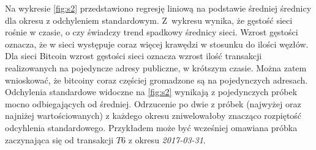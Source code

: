 \documentclass[12pt, twoside, final, openany]{mgr}
\begin{document}
\indent Na wykresie \ref{fig:s2} przedstawiono regresję liniową na podstawie średniej średnicy dla okresu z odchyleniem standardowym. Z~wykresu wynika, że gęstość sieci rośnie w czasie, o czy świadczy trend spadkowy średnicy sieci. Wzrost gęstości oznacza, że w sieci występuje coraz więcej krawędzi w stosunku do ilości węzłów. Dla sieci Bitcoin wzrost gęstości sieci oznacza wzrost ilość transakcji realizowanych na pojedyncze adresy publiczne, w krótszym czasie. Można zatem wnioskować, że bitcoiny coraz częściej gromadzone są na pojedynczych adresach. Odchylenia standardowe widoczne na \ref{fig:s2} wynikają z pojedynczych próbek mocno odbiegających od średniej. Odrzucenie po dwie z próbek (najwyżej oraz najniżej wartościowanych) z każdego okresu zniwelowałoby znacząco rozpiętość odcyhlenia standardowego. Przykładem może być wcześniej omawiana próbka zaczynająca się od transakcji $T6$ z okresu \textit{2017-03-31}. 
\end{document}
